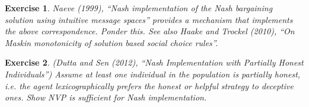 \documentclass[letter, 10pt]{article}
\theoremstyle{basic}
\newtheorem{exercise}{Exercise}[section]
\begin{document}
\begin{spacing}{1.0}
\begin{exercise}
  \hspace{1em}
  Naeve (1999), ``Nash implementation of the Nash bargaining
  solution using intuitive message spaces'' provides a mechanism that
  implements the above correspondence. Ponder this. See also Haake and
  Trockel (2010), ``On Maskin monotonicity of solution based social choice
  rules''.
\end{exercise}

\begin{exercise}
  (Dutta and Sen (2012), ``Nash Implementation with Partially Honest
  Individuals'') Assume at least one individual in the population is
  partially honest, i.e. the agent lexicographically prefers the honest or
  helpful strategy to deceptive ones. Show NVP is sufficient for Nash
  implementation.
\end{exercise}


\end{spacing}
\end{document}
